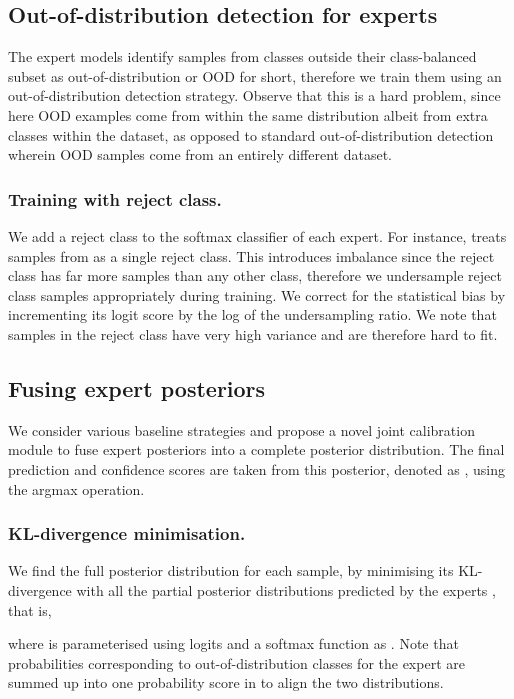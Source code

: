 \documentclass[runningheads]{llncs}
\begin{document}
\subsection{Out-of-distribution detection for experts}
\label{Out-of-distribution detection for experts}
The expert models identify samples from classes outside their class-balanced subset as out-of-distribution or OOD for short, therefore we train them using an out-of-distribution detection strategy. Observe that this is a hard problem, since here OOD examples come from within the same distribution albeit from extra classes within the dataset, as opposed to standard out-of-distribution detection wherein OOD samples come from an entirely different dataset.
\subsubsection{Training with reject class.}
We add a reject class to the softmax classifier of each expert. For instance,  treats samples from  as a single reject class. This introduces imbalance since the reject class has far more samples than any other class, therefore we undersample reject class samples appropriately during training. We correct for the statistical bias by incrementing its logit score by the log of the undersampling ratio. We note that samples in the reject class have very high variance and are therefore hard to fit.  

\subsection{Fusing expert posteriors}
We consider various baseline strategies and propose a novel joint calibration module to fuse expert posteriors  into a complete posterior distribution. The final prediction and confidence scores are taken from this posterior, denoted as , using the argmax operation.

\label{Fusing expert predictions}
\subsubsection{KL-divergence minimisation.} We find the full posterior distribution for each sample, by minimising its KL-divergence with all the partial posterior distributions predicted by the experts \cite{hinton2015distilling}, that is,  
\begin{center}
    
\end{center}
where  is parameterised using logits  and a softmax function as . Note that probabilities corresponding to out-of-distribution classes for the expert  are summed up into one probability score in  to align the two distributions. 
\end{document}
